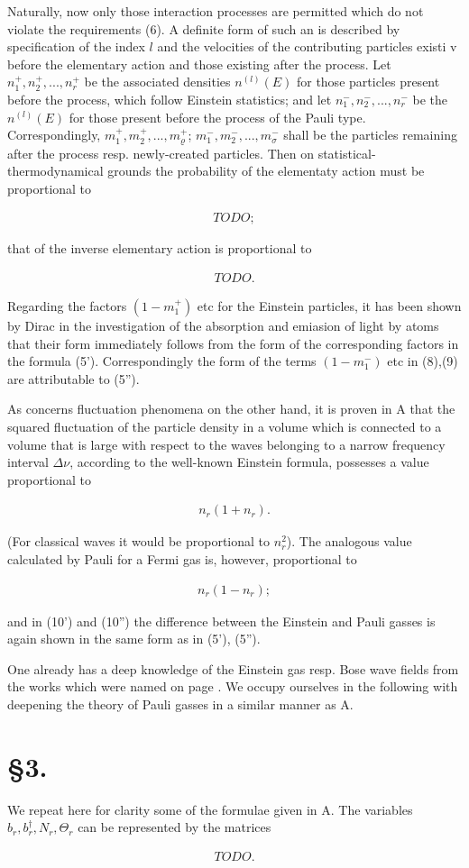 \documentclass{article}
\newcommand{\nequ}[2]{
\begin{align*}
#1
\tag{#2}
\end{align*}
}
\begin{document}
Naturally, now only those interaction processes are permitted which do not violate the requirements (6). A definite form of such an  is described by specification of the index $l$ and the velocities of the contributing particles existi v before the elementary action and those existing after the process. Let $n^+_1,n^+_2,...,n^+_r$ be the associated densities $n^{(l)}(E)$ for those particles present before the process, which follow Einstein statistics; and let $n^-_1,n^-_2,...,n^-_r$ be the $n^{(l)}(E)$ for those present before the process of the Pauli type. Correspondingly, $m^+_1,m^+_2,...,m^+_\varrho$; $m^-_1,m^-_2,...,m^-_\sigma$ shall be the particles remaining after the process resp. newly-created particles. Then on statistical-thermodynamical grounds the probability of the elementaty action must be proportional to
\nequ{TODO;}{8}
that of the inverse elementary action is proportional to
\nequ{TODO.}{9}
Regarding the factors $(1-m^+_1)$ etc for the Einstein particles, it has been shown by Dirac in the investigation of the absorption and emiasion of light by atoms that their form immediately follows from the form of the corresponding factors in the formula (5'). Correspondingly the form of the terms $(1-m^-_1)$ etc in (8),(9) are attributable to (5'').

As concerns fluctuation phenomena on the other hand, it is proven in A that the squared fluctuation of the particle density in a volume which is connected to a volume that is large with respect to the waves belonging to a narrow frequency interval $\Delta\nu$, according to the well-known Einstein formula, possesses a value proportional to
\nequ{
n_r(1+n_r).
}{10'}
(For classical waves it would be proportional to $n_r^2$). The analogous value calculated by Pauli for a Fermi gas is, however, proportional to
\nequ{
n_r(1-n_r);
}{10''}
and in (10') and (10'') the difference between the Einstein and Pauli gasses is again shown in the same form as in (5'), (5'').

One already has a deep knowledge of the Einstein gas resp. Bose wave fields from the works which were named on page . We occupy ourselves in the following with deepening the theory of Pauli gasses in a similar manner as A.

\section*{§3.}
We repeat here for clarity some of the formulae given in A. The variables $b_r,b^\dagger_r,N_r,\Theta_r$ can be represented by the matrices
\nequ{
TODO.
}{11}
\end{document}
